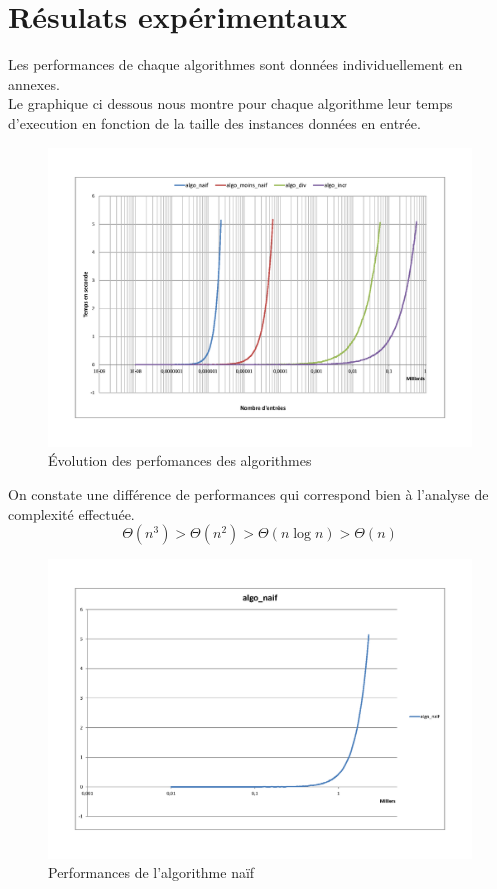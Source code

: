 \documentclass[11pt, a4paper]{article}
\begin{document}
\section{Résulats expérimentaux}

Les performances de chaque algorithmes sont données individuellement en
annexes. \\

Le graphique ci dessous nous montre pour chaque algorithme leur temps
d'execution en fonction de la taille des instances données en entrée.

\begin{figure}[h]
\includegraphics [scale=0.5]{images/comparatif.png}
\caption{Évolution des perfomances des algorithmes}
\end{figure}

On constate une différence de performances qui correspond bien à l'analyse de
complexité effectuée.
\[ \Theta{(n^3)} > \Theta{(n^2)} > \Theta{(n \log n)} > \Theta{(n)} \]

\appendix

\begin{figure}[h]
\includegraphics [scale=0.5]{images/algo_naif.png}
\caption{Performances de l'algorithme naïf}
\end{figure}
\end{document}
